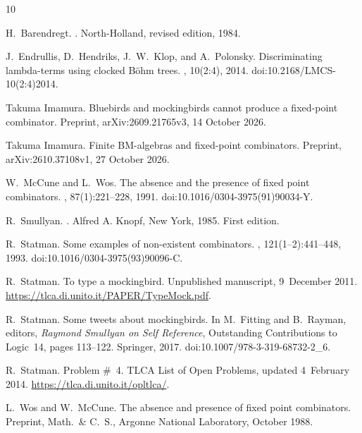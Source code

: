 \documentclass[a4paper,english]{lipics-v2021}
\begin{document}
\begin{thebibliography}{10}

H.~Barendregt.
.
\newblock North-Holland, revised edition, 1984.

J.~Endrullis, D.~Hendriks, J.~W.~Klop, and A.~Polonsky.
\newblock Discriminating lambda-terms using clocked Böhm trees.
, 10(2:4), 2014.
\newblock doi:10.2168/LMCS-10(2:4)2014.

Takuma Imamura.
\newblock Bluebirds and mockingbirds cannot produce a fixed-point combinator.
\newblock Preprint, arXiv:2609.21765v3, 14 October 2026.

Takuma Imamura.
\newblock Finite {BM}-algebras and fixed-point combinators.
\newblock Preprint, arXiv:2610.37108v1, 27 October 2026.

W.~McCune and L.~Wos.
\newblock The absence and the presence of fixed point combinators.
, 87(1):221--228, 1991.
\newblock doi:10.1016/0304-3975(91)90034-Y.

R.~Smullyan.
.
\newblock Alfred A. Knopf, New York, 1985. First edition.

R.~Statman.
\newblock Some examples of non-existent combinators.
, 121(1--2):441--448, 1993.
\newblock doi:10.1016/0304-3975(93)90096-C.

R.~Statman.
\newblock To type a mockingbird.
\newblock Unpublished manuscript, 9~December 2011.
\newblock \url{https://tlca.di.unito.it/PAPER/TypeMock.pdf}.

R.~Statman.
\newblock Some tweets about mockingbirds.
\newblock In M.~Fitting and B.~Rayman, editors, {\em Raymond Smullyan on Self Reference}, Outstanding Contributions to Logic~14, pages 113--122. Springer, 2017.
\newblock doi:10.1007/978-3-319-68732-2\_6.

R.~Statman.
\newblock Problem \#~4.
\newblock TLCA List of Open Problems, updated 4~February 2014.
\newblock \url{https://tlca.di.unito.it/opltlca/}.

L.~Wos and W.~McCune.
\newblock The absence and presence of fixed point combinators.
\newblock Preprint, Math.\ \& C.\ S., Argonne National Laboratory, October 1988.

\end{thebibliography}
\end{document}
